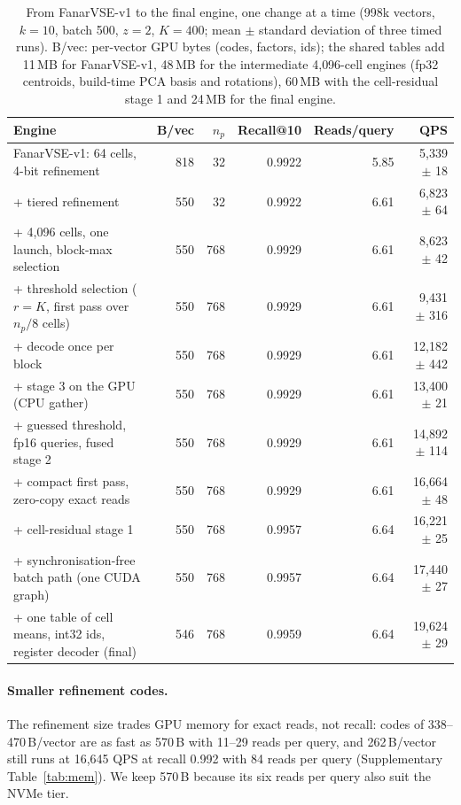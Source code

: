 \documentclass[fleqn,10pt]{wlscirep}
\begin{document}
\begin{table}[!htbp]
\caption{From FanarVSE-v1 to the final engine, one change at a time (998k vectors, $k=10$, batch 500, $z=2$, $K=400$; mean $\pm$ standard deviation of three timed runs). B/vec: per-vector GPU bytes (codes, factors, ids); the shared tables add 11\,MB for FanarVSE-v1, 48\,MB for the intermediate 4{,}096-cell engines (fp32 centroids, build-time PCA basis and rotations), 60\,MB with the cell-residual stage 1 and 24\,MB for the final engine.}
\label{tab:chain}
\small
\begin{tabular}{lrrrrr}
\toprule
Engine & B/vec & $n_p$ & Recall@10 & Reads/query & QPS \\
\midrule
FanarVSE-v1: 64 cells, 4-bit refinement & 818 & 32 & 0.9922 & 5.85 & 5{,}339 $\pm$ 18 \\
+ tiered refinement & 550 & 32 & 0.9922 & 6.61 & 6{,}823 $\pm$ 64 \\
+ 4{,}096 cells, one launch, block-max selection & 550 & 768 & 0.9929 & 6.61 & 8{,}623 $\pm$ 42 \\
+ threshold selection ($r=K$, first pass over $n_p/8$ cells) & 550 & 768 & 0.9929 & 6.61 & 9{,}431 $\pm$ 316 \\
+ decode once per block & 550 & 768 & 0.9929 & 6.61 & 12{,}182 $\pm$ 442 \\
+ stage 3 on the GPU (CPU gather) & 550 & 768 & 0.9929 & 6.61 & 13{,}400 $\pm$ 21 \\
+ guessed threshold, fp16 queries, fused stage 2 & 550 & 768 & 0.9929 & 6.61 & 14{,}892 $\pm$ 114 \\
+ compact first pass, zero-copy exact reads & 550 & 768 & 0.9929 & 6.61 & 16{,}664 $\pm$ 48 \\
+ cell-residual stage 1 & 550 & 768 & 0.9957 & 6.64 & 16{,}221 $\pm$ 25 \\
+ synchronisation-free batch path (one CUDA graph) & 550 & 768 & 0.9957 & 6.64 & 17{,}440 $\pm$ 27 \\
+ one table of cell means, int32 ids, register decoder (final) & 546 & 768 & 0.9959 & 6.64 & 19{,}624 $\pm$ 29 \\
\bottomrule
\end{tabular}
\end{table}

\paragraph{Smaller refinement codes.} The refinement size trades GPU memory for exact reads, not recall: codes of 338--470\,B/vector are as fast as 570\,B with 11--29 reads per query, and 262\,B/vector still runs at 16{,}645 QPS at recall 0.992 with 84 reads per query (Supplementary Table~\ref{tab:mem}). We keep 570\,B because its six reads per query also suit the NVMe tier.
\end{document}
